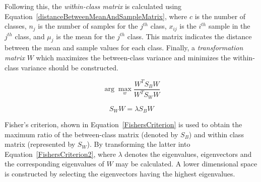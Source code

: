 Following this, the \textit{within-class matrix} is calculated using Equation~\ref{distanceBetweenMeanAndSampleMatrix}, where $c$ is the number of classes, $n_j$ is the number of samples for the $j^{th}$ class, $x_{ij}$ is the $i^{th}$ sample in the $j^{th}$ class, and $\mu_j$ is the mean for the $j^{th}$ class. This matrix indicates the distance between the mean and sample values for each class. Finally, a \textit{transformation matrix} $W$ which maximizes the between-class variance and minimizes the within-class variance should be constructed.

\begin{marginfigure}
	\begin{equation}
		\label{FishersCriterion}
		\arg\max_{w} \frac{W^T S_B W}{W^T S_W W}
		\end{equation}
	
	\begin{equation}
		\label{FishersCriterion2}
		S_W W = \lambda S_B W
		\end{equation}	
\end{marginfigure}


Fisher's criterion, shown in Equation~\ref{FishersCriterion} is used to obtain the maximum ratio of the between-class matrix (denoted by $S_B$) and within class matrix (represented by $S_W$). 
By transforming the latter into Equation~\ref{FishersCriterion2}, where $\lambda$ denotes the eigenvalues, eigenvectors and the corresponding eigenvalues of $W$ may be calculated. A lower dimensional space is constructed by selecting the eigenvectors having the highest eigenvalues. 

